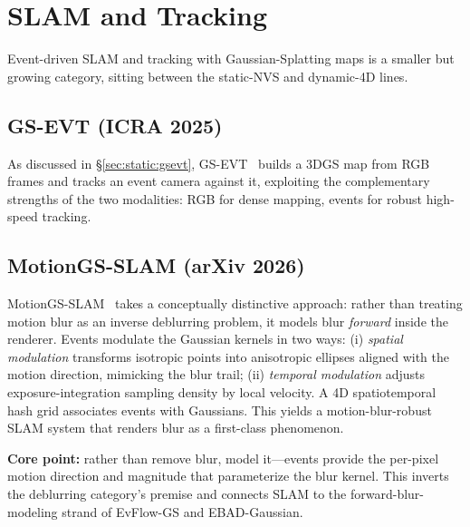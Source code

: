 \section{SLAM and Tracking}
\label{sec:slam}

Event-driven SLAM and tracking with Gaussian-Splatting maps is a smaller but growing category, sitting between the static-NVS and dynamic-4D lines.

\subsection{GS-EVT (ICRA 2025)}
\label{sec:slam:gsevt}

As discussed in \S\ref{sec:static:gsevt}, GS-EVT~\cite{liu2025gsevt} builds a 3DGS map from RGB frames and tracks an event camera against it, exploiting the complementary strengths of the two modalities: RGB for dense mapping, events for robust high-speed tracking.

\subsection{MotionGS-SLAM (arXiv 2026)}
\label{sec:slam:motiongs}

MotionGS-SLAM~\cite{hu2026motiongs} takes a conceptually distinctive approach: rather than treating motion blur as an inverse deblurring problem, it models blur \emph{forward} inside the renderer. Events modulate the Gaussian kernels in two ways: (i) \emph{spatial modulation} transforms isotropic points into anisotropic ellipses aligned with the motion direction, mimicking the blur trail; (ii) \emph{temporal modulation} adjusts exposure-integration sampling density by local velocity. A 4D spatiotemporal hash grid associates events with Gaussians. This yields a motion-blur-robust SLAM system that renders blur as a first-class phenomenon.

\textbf{Core point:} rather than remove blur, model it---events provide the per-pixel motion direction and magnitude that parameterize the blur kernel. This inverts the deblurring category's premise and connects SLAM to the forward-blur-modeling strand of EvFlow-GS and EBAD-Gaussian.

